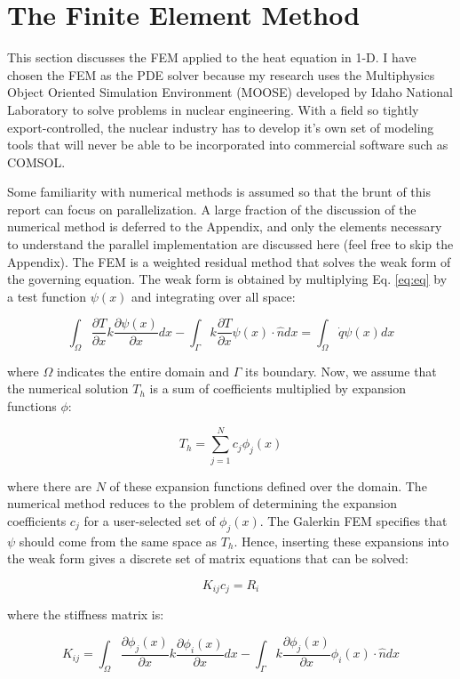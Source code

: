 \documentclass[10pt]{article}
\newcommand{\beq}{\begin{equation}}
\newcommand{\eeq}{\end{equation}}
\begin{document}
\section{The Finite Element Method}
This section discusses the FEM applied to the heat equation in 1-D. I have chosen the FEM as the PDE solver because my research uses the Multiphysics Object Oriented Simulation Environment (MOOSE) developed by Idaho National Laboratory to solve problems in nuclear engineering. With a field so tightly export-controlled, the nuclear industry has to develop it's own set of modeling tools that will never be able to be incorporated into commercial software such as COMSOL.

Some familiarity with numerical methods is assumed so that the brunt of this report can focus on parallelization. A large fraction of the discussion of the numerical method is deferred to the Appendix, and only the elements necessary to understand the parallel implementation are discussed here (feel free to skip the Appendix). The FEM is a weighted residual method that solves the weak form of the governing equation. The weak form is obtained by multiplying Eq. \eqref{eq:eq} by a test function \(\psi(x)\) and integrating over all space:

\beq
\int_{\Omega}\frac{\partial T}{\partial x}k\frac{\partial\psi(x)}{\partial x}dx-\int_{\Gamma}k\frac{\partial T}{\partial x}\psi(x)\cdot\hat{n}dx=\int_{\Omega}\dot{q}\psi(x)dx
\eeq

where \(\Omega\) indicates the entire domain and \(\Gamma\) its boundary. Now, we assume that the numerical solution \(T_h\) is a sum of coefficients multiplied by expansion functions \(\phi\):

\beq
T_h=\sum_{j=1}^{N}c_j\phi_j(x)
\eeq

where there are \(N\) of these expansion functions defined over the domain. The numerical method reduces to the problem of determining the expansion coefficients \(c_j\) for a user-selected set of \(\phi_j(x)\). The Galerkin FEM specifies that \(\psi\) should come from the same space as \(T_h\). Hence, inserting these expansions into the weak form gives a discrete set of matrix equations that can be solved:

\beq
K_{ij}c_j=R_i
\eeq

where the stiffness matrix is:

\beq
\label{eq:k}
K_{ij}=\int_{\Omega}\frac{\partial \phi_j(x)}{\partial x}k\frac{\partial\phi_i(x)}{\partial x}dx-\int_{\Gamma}k\frac{\partial \phi_j(x)}{\partial x}\phi_i(x)\cdot\hat{n}dx
\eeq
\end{document}

